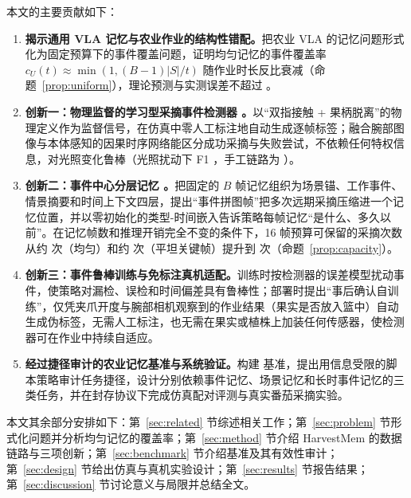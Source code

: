 本文的主要贡献如下：
\begin{enumerate}
\item \textbf{揭示通用 VLA 记忆与农业作业的结构性错配。}把农业 VLA 的记忆问题形式化为固定预算下的事件覆盖问题，证明均匀记忆的事件覆盖率 $c_U(t)\approx\min(1,(B-1)|S|/t)$ 随作业时长反比衰减（命题~\ref{prop:uniform}），理论预测与实测误差不超过 。
\item \textbf{创新一：物理监督的学习型采摘事件检测器 \pedet。}以“双指接触 + 果柄脱离”的物理定义作为监督信号，在仿真中零人工标注地自动生成逐帧标签；融合腕部图像与本体感知的因果时序网络能区分成功采摘与失败尝试，不依赖任何特权信息，对光照变化鲁棒（光照扰动下 F1 ，手工链路为 ）。
\item \textbf{创新二：事件中心分层记忆 \hem。}把固定的 $B$ 帧记忆组织为场景锚、工作事件、情景摘要和时间上下文四层，提出“事件拼图帧”把多次远期采摘压缩进一个记忆位置，并以零初始化的类型-时间嵌入告诉策略每帧记忆“是什么、多久以前”。在记忆帧数和推理开销完全不变的条件下，16 帧预算可保留的采摘次数从约  次（均匀）和约  次（平坦关键帧）提升到  次（命题~\ref{prop:capacity}）。
\item \textbf{创新三：事件鲁棒训练与免标注真机适配。}训练时按检测器的误差模型扰动事件，使策略对漏检、误检和时间偏差具有鲁棒性；部署时提出“事后确认自训练”，仅凭夹爪开度与腕部相机观察到的作业结果（果实是否放入篮中）自动生成伪标签，无需人工标注，也无需在果实或植株上加装任何传感器，使检测器可在作业中持续自适应。
\item \textbf{经过捷径审计的农业记忆基准与系统验证。}构建 \bench{} 基准，提出用信息受限的脚本策略审计任务捷径，设计分别依赖事件记忆、场景记忆和长时事件记忆的三类任务，并在封存协议下完成仿真配对评测与真实番茄采摘实验。
\end{enumerate}

本文其余部分安排如下：第~\ref{sec:related} 节综述相关工作；第~\ref{sec:problem} 节形式化问题并分析均匀记忆的覆盖率；第~\ref{sec:method} 节介绍 HarvestMem 的数据链路与三项创新；第~\ref{sec:benchmark} 节介绍基准及其有效性审计；第~\ref{sec:design} 节给出仿真与真机实验设计；第~\ref{sec:results} 节报告结果；第~\ref{sec:discussion} 节讨论意义与局限并总结全文。
